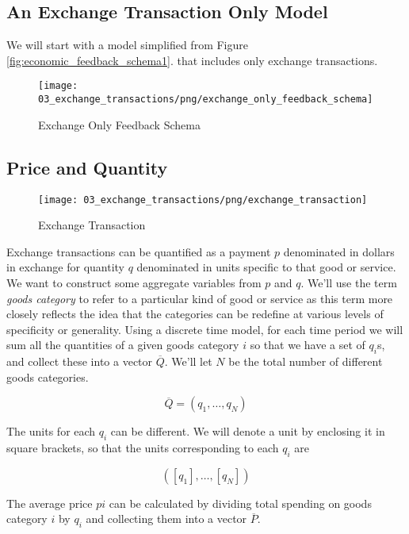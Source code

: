 \subsection{An Exchange Transaction Only Model}

We will start with a model simplified from Figure \ref{fig:economic_feedback_schema1}. that includes only
exchange transactions.

\begin{figure}[H]
\centering
\texttt{[image: 03\_exchange\_transactions/png/exchange\_only\_feedback\_schema]}
\caption{Exchange Only Feedback Schema}
\label{fig:exchange_only_feedback_schema1}
\end{figure}

\subsection{Price and Quantity}

\begin{figure}[H]
\centering
\texttt{[image: 03\_exchange\_transactions/png/exchange\_transaction]}
\caption{Exchange Transaction}
\label{fig:exchange_transaction2}
\end{figure}

Exchange transactions can be quantified as a payment $p$ denominated in dollars in exchange for
quantity $q$ denominated in units specific to that good or service. We want to construct some
aggregate variables from $p$ and $q$. We'll use the term \textit{goods category} to refer to a
particular kind of good or service as this term more closely reflects the idea that the categories
can be redefine at various levels of specificity or generality. Using a discrete time model, for
each time period we will sum all the quantities of a given goods category $i$ so that we have a set
of $q_i$s, and collect these into a vector $\overline Q$. We'll let $N$ be the total number of
different goods categories.

\begin{equation} \label{eq:qbar}
    \overline Q = \left( q_1, \dots, q_N \right)
\end{equation}

The units for each $q_i$ can be different. We will denote a unit by enclosing it in square brackets,
so that the units corresponding to each $q_i$ are

\[ \left( \left[ q_1 \right], \dots, \left[ q_N \right] \right) \]

The average price $pi$ can be calculated by dividing total spending on goods category $i$ by $q_i$
and collecting them into a vector $\overline P$.

